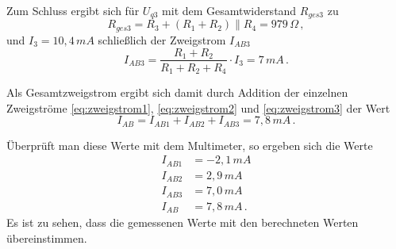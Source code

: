 Zum Schluss ergibt sich für $U_{q3}$ mit dem Gesamtwiderstand $R_{ges3}$ zu
\begin{equation*}
    R_{ges3}=R_3+(R_1+R_2)\parallel{R_4}=979\,\Omega\, ,
\end{equation*} und $I_{3}=10,4\,mA$ schließlich der Zweigstrom $I_{AB3}$
\begin{equation}
    \label{eq:zweigstrom3}
    I_{AB3}=\frac{R_1+R_2}{R_1+R_2+R_4}\cdot I_{3}=7\,mA\, .
\end{equation}

Als Gesamtzweigstrom ergibt sich damit durch Addition der einzelnen Zweigströme {\eqref{eq:zweigstrom1}}, {\eqref{eq:zweigstrom2}} und {\eqref{eq:zweigstrom3}} der Wert
\begin{equation}
    I_{AB}=I_{AB1}+I_{AB2}+I_{AB3}=7,8\,mA\, .
\end{equation}

Überprüft man diese Werte mit dem Multimeter, so ergeben sich die Werte
\begin{align*}
    I_{AB1} & = -2,1\,mA    \\
    I_{AB2} & = 2,9\,mA     \\
    I_{AB3} & = 7,0\,mA     \\
    I_{AB}  & = 7,8\,mA\, .
\end{align*}
Es ist zu sehen, dass die gemessenen Werte mit den berechneten Werten übereinstimmen.




